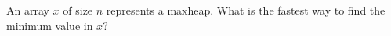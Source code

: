 An array $x$ of size $n$ represents a maxheap.
What is the fastest way to find the minimum value in $x$?
